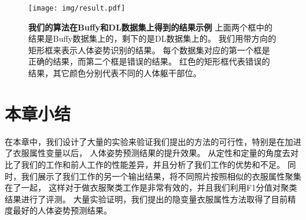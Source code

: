 \begin{figure}
\centering
\texttt{[image: img/result.pdf]}
\caption{ \textbf{我们的算法在Buffy和DL数据集上得到的结果示例}
上面两个框中的结果是Buffy数据集上的，剩下的是DL数据集上的。
我们用带方向的矩形框来表示人体姿势识别的结果。
每个数据集对应的第一个框是正确的结果，而第二个框是错误的结果。
红色的矩形框代表错误的结果，其它颜色分别代表不同的人体躯干部位。
}
\label{fig:result}
\end{figure}

\section{本章小结}
在本章中，我们设计了大量的实验来验证我们提出的方法的可行性，特别是在加进了衣服属性变量以后，
人体姿势预测结果的提升效果。
从定性和定量的角度去对比了我们的工作和前人工作的性能差异，并且分析了我们工作的优势和不足。
同时，我们展示了我们工作的另一个输出结果，将不同照片按照相似的衣服属性聚集在了一起，
这样对于做衣服聚类工作是非常有效的，并且我们利用F1分值对聚类结果进行了评测。
大量实验证明，我们提出的隐变量衣服属性方法取得了目前精度最好的人体姿势预测结果。
